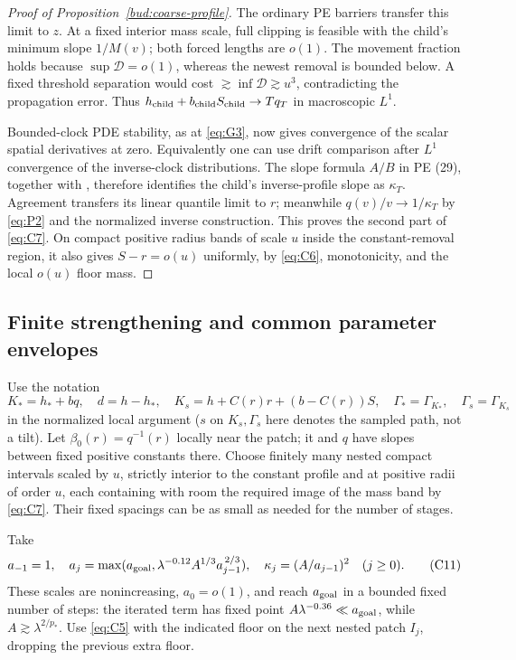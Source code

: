 \begin{proof}[Proof of Proposition~\ref{bud:coarse-profile}]
The ordinary PE barriers transfer this limit to \(z\). At a fixed
interior mass scale, full clipping is feasible with the child's minimum
slope \(1/M(v)\); both forced lengths are \(o(1)\).
The movement fraction holds because \(\sup\mathcal D=o(1)\),
whereas the newest removal is bounded below. A fixed threshold
separation would cost \(\gtrsim\inf\mathcal D\gtrsim u^3\),
contradicting the propagation error. Thus
\(h_{\rm child}+b_{\rm child}S_{\rm child}\to Tq_T\) in
macroscopic \(L^1\).

Bounded-clock PDE stability, as at \eqref{eq:G3}, now gives convergence
of the scalar spatial derivatives at zero. Equivalently one can use
drift comparison after \(L^1\) convergence of the inverse-clock
distributions. The slope formula \(A/B\) in PE (29), together with
\cite[Lemma~5.8]{PE}, therefore identifies the child's inverse-profile slope as
\(\kappa_T\). Agreement transfers its linear quantile limit to
\(r\); meanwhile \(q(v)/v\to1/\kappa_T\) by \eqref{eq:P2}
and the normalized inverse construction. This proves the second part
of \eqref{eq:C7}. On compact positive radius bands of scale \(u\)
inside the constant-removal region, it also gives \(S-r=o(u)\)
uniformly, by \eqref{eq:C6}, monotonicity, and the local \(o(u)\)
floor mass.
\end{proof}


\subsection{Finite strengthening and common parameter envelopes}

Use the notation
\[
 K_*=h_*+bq,\quad d=h-h_*,\quad K_s=h+C(r)r+(b-C(r))S,\quad
 \Gamma_*=\Gamma_{K_*},\quad \Gamma_s=\Gamma_{K_s}
\]
in the normalized local argument (\(s\) on \(K_s,\Gamma_s\) here denotes the sampled path, not a tilt). Let \(\beta_0(r)=q^{-1}(r)\) locally near the patch; it and \(q\) have slopes between fixed positive constants there. Choose finitely many nested compact intervals scaled by \(u\), strictly interior to the constant profile and at positive radii of order \(u\), each containing with room the required image of the mass band by \eqref{eq:C7}. Their fixed spacings can be as small as needed for the number of stages.

Take
\[
 a_{-1}=1,\quad
 a_j=\max(a_{\rm goal},\lambda^{-0.12} A^{1/3} a_{j-1}^{\,2/3}),\quad
 \kappa_j=(A/a_{j-1})^2\quad (j\ge0).                                   \tag{C11}\label{eq:C11}
\]
These scales are nonincreasing, \(a_0=o(1)\), and reach \(a_{\rm goal}\) in a bounded fixed number of steps: the iterated term has fixed point \(A\lambda^{-0.36}\ll a_{\rm goal}\), while \(A\gtrsim\lambda^{2/p_*}\). Use \eqref{eq:C5} with the indicated floor on the next nested patch \(I_j\), dropping the previous extra floor.

